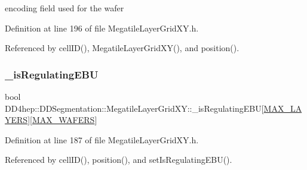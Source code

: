 encoding field used for the wafer 



Definition at line 196 of file Megatile\+Layer\+Grid\+X\+Y.\+h.



Referenced by cell\+I\+D(), Megatile\+Layer\+Grid\+X\+Y(), and position().

\hypertarget{class_d_d4hep_1_1_d_d_segmentation_1_1_megatile_layer_grid_x_y_a46909b6552b97789492f2b8c97ed8cb6}{}\label{class_d_d4hep_1_1_d_d_segmentation_1_1_megatile_layer_grid_x_y_a46909b6552b97789492f2b8c97ed8cb6} 
\subsubsection{\texorpdfstring{\+\_\+is\+Regulating\+E\+BU}{\_isRegulatingEBU}}
{\footnotesize\ttfamily bool D\+D4hep\+::\+D\+D\+Segmentation\+::\+Megatile\+Layer\+Grid\+X\+Y\+::\+\_\+is\+Regulating\+E\+BU\mbox{[}\hyperlink{_megatile_layer_grid_x_y_8h_ade9d4b2ac5f29fe89ffea40e7c58c9d6}{M\+A\+X\+\_\+\+L\+A\+Y\+E\+RS}\mbox{]}\mbox{[}\hyperlink{_d_d_segmentation_2include_2_d_d_segmentation_2_wafer_grid_x_y_8h_ace2f1e396fdb2a1510290218c8cb476a}{M\+A\+X\+\_\+\+W\+A\+F\+E\+RS}\mbox{]}\hspace{0.3cm}{\ttfamily [protected]}}



Definition at line 187 of file Megatile\+Layer\+Grid\+X\+Y.\+h.



Referenced by cell\+I\+D(), position(), and set\+Is\+Regulating\+E\+B\+U().

\hypertarget{class_d_d4hep_1_1_d_d_segmentation_1_1_megatile_layer_grid_x_y_a71605d3d5b86f140cfb6c2d7458e3cd8}{}\label{class_d_d4hep_1_1_d_d_segmentation_1_1_megatile_layer_grid_x_y_a71605d3d5b86f140cfb6c2d7458e3cd8} 

